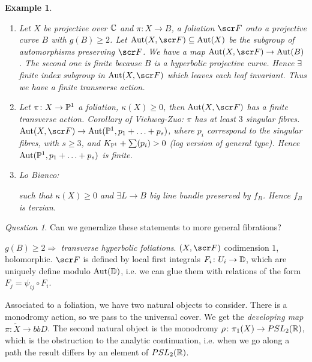 \documentclass[A4paper, british]{amsart}
\theoremstyle{darkgreentheorem}
\theoremstyle{darkbluedefinition}
\theoremstyle{darkredexample}
\newtheorem{exa}[thm]{Example}
\theoremstyle{remark}
\newtheorem{q}[thm]{Question}
\DeclareMathOperator{\Aut}{Aut}
\newcommand{\1}{\mathbbm{1}}
\newcommand{\sub}{\subseteq}
\begin{document}
\begin{exa}
    \begin{enumerate}
	\item Let $X$ be projective over $\C$ and $\pi\colon X\to B$, a foliation $\F$ onto a projective curve $B$ with $g(B)\geqslant 2$.
	    Let $\Aut(X,\F)\sub\Aut(X)$ be the subgroup of automorphisms preserving $\F$.
	    We have a map $\Aut(X,\F)\to \Aut(B)$.
	    The second one is finite because $B$ is a hyperbolic projective curve.
	    Hence $\exists $ finite index subgroup in $\Aut(X,\F)$ which leaves each leaf invariant.
	    Thus we have a finite transverse action.
	\item Let $\pi\colon X\to \P^{1}$ a foliation, $\kappa(X)\geqslant 0$, then $\Aut(X,\F)$ has a finite transverse action.
	    Corollary of Viehweg-Zuo: $\pi$ has at least $3$ singular fibres.
	    $\Aut(X,\F)\to \Aut(\P^{1},p_{1}+\ldots +p_{s})$, where $p_{i}$ correspond to the singular fibres, with $s\geqslant 3$, and $K_{\P^{1}}+\sum(p_{i}) >0$ (log version of general type).
	    Hence $\Aut(\P^{1},p_{1}+\ldots+p_{s})$ is finite.
	\item Lo Bianco:
	    \begin{center}
	    \end{center}
	    such that $\kappa(X)\geqslant 0$ and $\exists L\to B$ big line bundle preserved by $f_{B}$.
	    Hence $f_{B}$ is terzian.
    \end{enumerate}
\end{exa}

\begin{q}
    Can we generalize these statements to more general fibrations?
\end{q}
$g(B)\geqslant 2\Rightarrow $ \textit{transverse hyperbolic foliations}.
$(X,\F)$ codimension $1$, holomorphic.
$\F$ is defined by local first integrals $F_{i}\colon U_{i}\to \bbD$, which are uniquely define modulo $\Aut(\bbD)$, i.e. we can glue them with relations of the form $F_{j}=\psi_{ij}\circ F_{i}$.

Associated to a foliation, we have two natural objects to consider.
There is a monodromy action, so we pass to the universal cover.
We get the \textit{developing map} $\pi\colon \tilde{X}\to bbD$.
The second natural object is the monodromy $\rho\colon \pi_{1}(X)\to PSL_{2}(\R)$, which is the obstruction to the analytic continuation, i.e. when we go along a path the result differs by an element of $PSL_{2}(\R)$.
\end{document}
